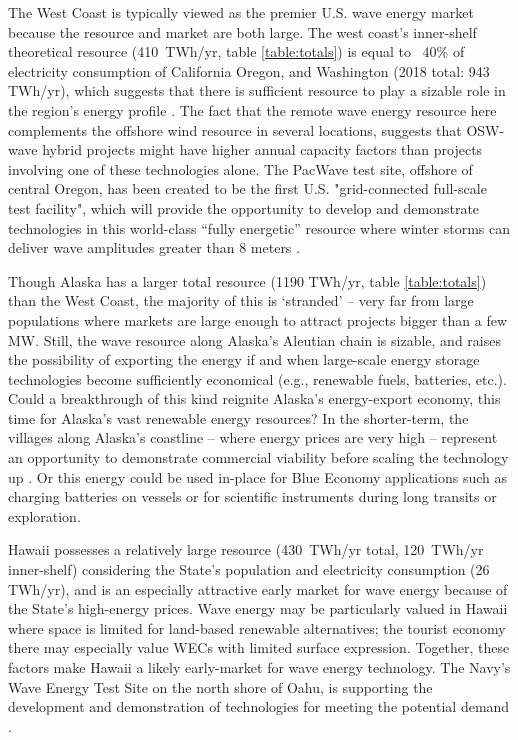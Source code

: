 The West Coast is typically viewed as the premier U.S. wave energy market because the resource and market are both large. The west coast's inner-shelf theoretical resource (410~TWh/yr, table \ref{table:totals}) is equal to ~40\% of electricity consumption of California Oregon, and Washington (2018 total: 943 TWh/yr), which suggests that there is sufficient resource to play a sizable role in the region's energy profile \citep{energyinformationadministrationStateEnergyConsumption2020}.  
The fact that the remote wave energy resource here complements the offshore wind resource in several locations, suggests that OSW-wave hybrid projects might have higher annual capacity factors than projects involving one of these technologies alone. The PacWave test site, offshore of central Oregon, has been created to be the first U.S. "grid-connected full-scale test facility", which will provide the opportunity to develop and demonstrate technologies in this world-class ``fully energetic'' resource where winter storms can deliver wave amplitudes greater than 8 meters \citep[e.g.][]{allan_climate_2006}.

Though Alaska has a larger total resource (1190 TWh/yr, table \ref{table:totals}) than the West Coast, the majority of this is `stranded' -- very far from large populations where markets are large enough to attract projects bigger than a few MW. Still, the wave resource along Alaska's Aleutian chain is sizable, and raises the possibility of exporting the energy if and when large-scale energy storage technologies become sufficiently economical (e.g., renewable fuels, batteries, etc.). Could a breakthrough of this kind reignite Alaska's energy-export economy, this time for Alaska's vast renewable energy resources? In the shorter-term, the villages along Alaska's coastline -- where energy prices are very high -- represent an opportunity to demonstrate commercial viability before scaling the technology up \cite{alaskaenergyauthority2019PowerCost2020}. Or this energy could be used in-place for Blue Economy applications such as charging batteries on vessels or for scientific instruments during long transits or exploration. 

Hawaii possesses a relatively large resource (430~TWh/yr total, 120~TWh/yr inner-shelf) considering the State's population and electricity consumption (26 TWh/yr), and is an especially attractive early market for wave energy because of the State's high-energy prices. 
Wave energy may be particularly valued in Hawaii where space is limited for land-based renewable alternatives; the tourist economy there may especially value WECs with limited surface expression. Together, these factors make Hawaii a likely early-market for wave energy technology. The Navy's Wave Energy Test Site on the north shore of Oahu, is supporting the development and demonstration of technologies for meeting the potential demand \citep{crossEarlyResearchEfforts2015}.

